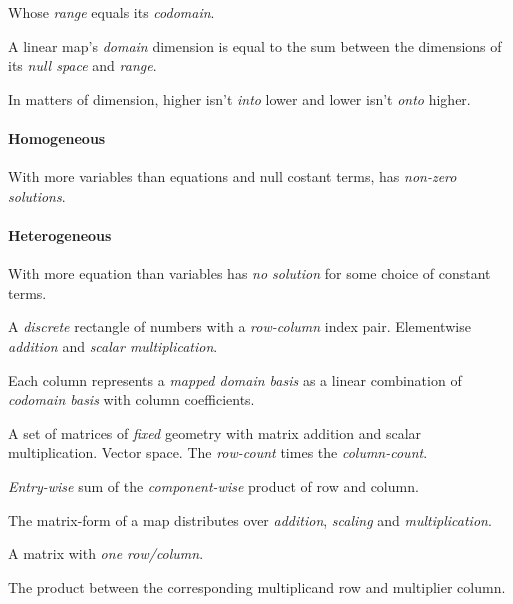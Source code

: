 \begin{multicols}{3}
  Whose \textit{range} equals its \textit{codomain}.

  A linear map's \textit{domain} dimension is equal to the sum between the dimensions of its \textit{null space} and \textit{range}.

  In matters of dimension, higher isn't \textit{into} lower and lower isn't \textit{onto} higher.

  \paragraph{\textbf{Homogeneous}}
  With more variables than equations and null costant terms, has \textit{non-zero solutions}.
  
  \paragraph{\textbf{Heterogeneous}}
  With more equation than variables has \textit{no solution} for some choice of constant terms.
  
  A \textit{discrete} rectangle of numbers with a \textit{row-column} index pair.
  Elementwise \textit{addition} and \textit{scalar multiplication}.
  
  Each column represents a \textit{mapped domain basis} as a linear combination of \textit{codomain basis} with column coefficients.

  A set of matrices of \textit{fixed} geometry with matrix addition and scalar multiplication.
  Vector space.
  The \textit{row-count} times the \textit{column-count}.
  
  \textit{Entry-wise} sum of the \textit{component-wise} product of row and column.
  
  The matrix-form of a map distributes over \textit{addition}, \textit{scaling} and \textit{multiplication}.

  A matrix with \textit{one row/column}.

  The product between the corresponding multiplicand row and multiplier column.


\end{multicols}
